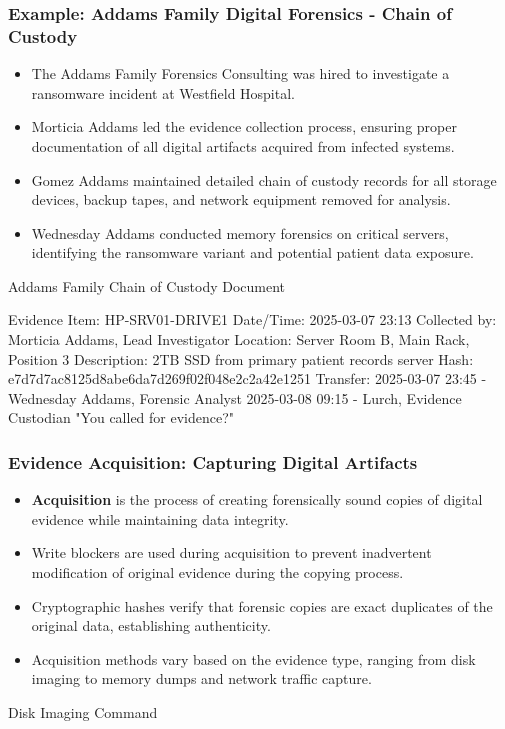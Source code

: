 \documentclass{beamer}
\begin{document}
\begin{frame}[fragile]
\frametitle{Example: Addams Family Digital Forensics - Chain of Custody}
\scriptsize
\begin{itemize}
\item The Addams Family Forensics Consulting was hired to investigate a ransomware incident at Westfield Hospital.
\item Morticia Addams led the evidence collection process, ensuring proper documentation of all digital artifacts acquired from infected systems.
\item Gomez Addams maintained detailed chain of custody records for all storage devices, backup tapes, and network equipment removed for analysis.
\item Wednesday Addams conducted memory forensics on critical servers, identifying the ransomware variant and potential patient data exposure.
\end{itemize}

\begin{exampleblock}{Addams Family Chain of Custody Document}
\begin{semiverbatim}
Evidence Item: HP-SRV01-DRIVE1
Date/Time: 2025-03-07 23:13 
Collected by: Morticia Addams, Lead Investigator
Location: Server Room B, Main Rack, Position 3
Description: 2TB SSD from primary patient records server
Hash: e7d7d7ac8125d8abe6da7d269f02f048e2c2a42e1251
Transfer: 
2025-03-07 23:45 - Wednesday Addams, Forensic Analyst
2025-03-08 09:15 - Lurch, Evidence Custodian
"You called for evidence?"
\end{semiverbatim}
\end{exampleblock}
\end{frame}



\begin{frame}[fragile]
\frametitle{Evidence Acquisition: Capturing Digital Artifacts}
\begin{itemize}
\item \textbf{Acquisition} is the process of creating forensically sound copies of digital evidence while maintaining data integrity.
\item Write blockers are used during acquisition to prevent inadvertent modification of original evidence during the copying process.
\item Cryptographic hashes verify that forensic copies are exact duplicates of the original data, establishing authenticity.
\item Acquisition methods vary based on the evidence type, ranging from disk imaging to memory dumps and network traffic capture.
\end{itemize}

\begin{exampleblock}{Disk Imaging Command}
\scriptsize
{}
\end{exampleblock}
\end{frame}
\end{document}
